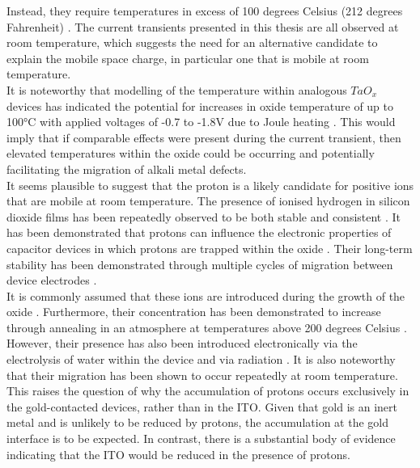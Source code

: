 \noindent Instead, they require temperatures in excess of 100 degrees Celsius (212 degrees Fahrenheit) \cite{deal1974current}. The current transients presented in this thesis are all observed at room temperature, which suggests the need for an alternative candidate to explain the mobile space charge, in particular one that is mobile at room temperature. \\

\noindent It is noteworthy that modelling of the temperature within analogous $TaO_x$ devices has indicated the potential for increases in oxide temperature of up to 100°C with applied voltages of -0.7 to -1.8V due to Joule heating \cite{shen2021experimentally}. This would imply that if comparable effects were present during the current transient, then elevated temperatures within the oxide could be occurring and potentially facilitating the migration of alkali metal defects.\\

\noindent It seems plausible to suggest that the proton \cite{hofstein1967proton} is a likely candidate for positive ions that are mobile at room temperature. The presence of ionised hydrogen in silicon dioxide films has been repeatedly observed to be both stable and consistent \cite{vanheusden1998chemical}. It has been demonstrated that protons can influence the electronic properties of capacitor devices in which protons are trapped within the oxide \cite{vanheusden1999non}. Their long-term stability has been demonstrated through multiple cycles of migration between device electrodes \cite{warren1997protonic}. \\

\noindent It is commonly assumed that these ions are introduced during the growth of the oxide \cite{vanheusden1998thermally}. Furthermore, their concentration has been demonstrated to increase through annealing in an atmosphere at temperatures above 200 degrees Celsius \cite{lifshitz1989detection}. However, their presence has also been introduced electronically via the electrolysis of water within the device and via radiation \cite{winokur1977field}. It is also noteworthy that their migration has been shown to occur repeatedly at room temperature.\\

\noindent This raises the question of why the accumulation of protons occurs exclusively in the gold-contacted devices, rather than in the ITO. Given that gold is an inert metal and is unlikely to be reduced by protons, the accumulation at the gold interface is to be expected. In contrast, there is a substantial body of evidence indicating that the ITO would be reduced in the presence of protons.\\

